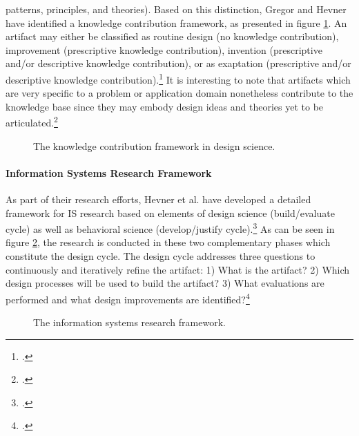 patterns, principles, and theories). Based on this distinction, Gregor and Hevner have identified a knowledge contribution framework, as presented in figure \ref{fig:DSRKnowledgeContribution}. An artifact may either be classified as routine design (no knowledge contribution), improvement (prescriptive knowledge contribution), invention (prescriptive and/or descriptive knowledge contribution), or as exaptation (prescriptive and/or descriptive knowledge contribution).\footcite[Cf.][p.344 et seqq]{GregorPositioningpresentingdesign2013} It is interesting to note that artifacts which are very specific to a problem or application domain nonetheless contribute to the knowledge base since they may embody design ideas and theories yet to be articulated.\footcite[Cf.][p.340]{GregorPositioningpresentingdesign2013}

\begin{figure}[H]
    \centering
    
    \caption[The knowledge contribution framework in design science.]{The knowledge contribution framework in design science.\protect\footnotemark}
    \label{fig:DSRKnowledgeContribution}
\end{figure}


\paragraph{Information Systems Research Framework}  \label{topic:design cycle}
As part of their research efforts, Hevner et al. have developed a detailed framework for \ac{IS} research based on elements of design science (build/evaluate cycle) as well as behavioral science (develop/justify cycle).\footcite[Cf.][p.80 et seqq]{HevnerDesignScienceResearch2004}
As can be seen in figure \ref{fig:ISRFramework}, the research is conducted in these two complementary phases which constitute the design cycle. The design cycle addresses three questions to continuously and iteratively refine the artifact: 1) What is the artifact? 2) Which design processes will be used to build the artifact? 3) What evaluations are performed and what design improvements are identified?\footcites[Cf.][p.19]{HevnerDesignResearchInformation2010}[cf.][p.90]{Hevnerthreecycleview2007}[cf.][p.89]{Hevnerthreecycleview2007}

\begin{figure}
    \centering
    
    \caption[The information systems research framework]{The information systems research framework.\protect\footnotemark}
    \label{fig:ISRFramework}
\end{figure}


